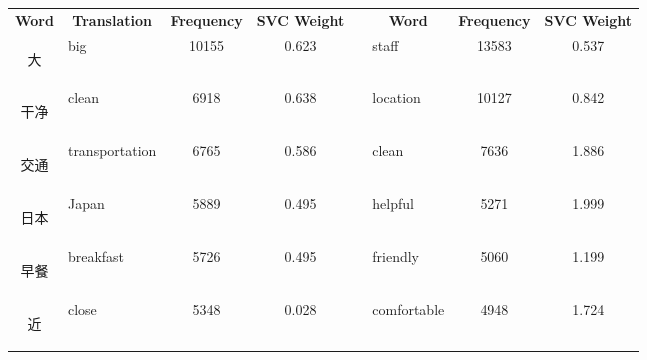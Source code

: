 \documentclass[smallextended,natbib]{svjour3}       %
\begin{document}
\begin{table}[h]
{\begin{tabular}{|c|l|c|c|l|l|c|c|}
\textbf{Word} & \multicolumn{1}{c|}{\textbf{Translation}} & \textbf{Frequency} & \textbf{SVC Weight} & \multicolumn{1}{c|}{\textbf{}} & \multicolumn{1}{c|}{\textbf{Word}} & \textbf{Frequency} & \textbf{SVC Weight} \\ \cline{1-4} \cline{6-8} 
\begin{CJK}{UTF8}{gbsn} 大 \end{CJK}             & big                                       & 10155              & 0.623               &                                & staff                              & 13583              & 0.537               \\ \cline{1-4} \cline{6-8} 
\begin{CJK}{UTF8}{gbsn} 干净 \end{CJK}            & clean                                     & 6918               & 0.638               &                                & location                           & 10127              & 0.842               \\ \cline{1-4} \cline{6-8} 
\begin{CJK}{UTF8}{gbsn} 交通 \end{CJK}            & transportation                            & 6765               & 0.586               &                                & clean                              & 7636               & 1.886               \\ \cline{1-4} \cline{6-8} 
\begin{CJK}{UTF8}{gbsn} 日本 \end{CJK}            & Japan                                     & 5889               & 0.495               &                                & helpful                            & 5271               & 1.999               \\ \cline{1-4} \cline{6-8} 
\begin{CJK}{UTF8}{gbsn} 早餐 \end{CJK}            & breakfast                                 & 5726               & 0.495               &                                & friendly                           & 5060               & 1.199               \\ \cline{1-4} \cline{6-8} 
\begin{CJK}{UTF8}{gbsn} 近 \end{CJK}             & close                                     & 5348               & 0.028               &                                & comfortable                        & 4948               & 1.724               \\ \cline{1-4} \cline{6-8} 

\end{tabular}}
\end{table}
\end{document}
